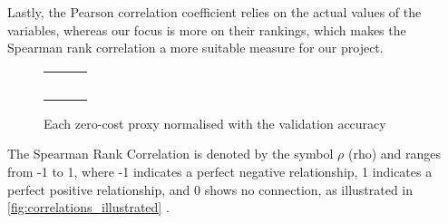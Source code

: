 Lastly, the Pearson correlation coefficient relies on the actual values of the variables, whereas our focus is more on their rankings, which makes the Spearman rank correlation a more suitable measure for our project.


\clearpage

\begin{figure}[h!]
  \centering
    \begin{adjustbox}{width=1.2\columnwidth,center}
  \begin{tabular}{ccc}
     &
     &
     \\
     &
     &
     \\
     &
     &
     \\
     &
     &
     \\
     &
     
  \end{tabular}
  \end{adjustbox}
  \caption{Each zero-cost proxy normalised with the validation accuracy}
  \label{fig:zero_cost_proxies_outliers}
\end{figure}

The Spearman Rank Correlation is denoted by the symbol $\rho$ (rho) and ranges from -1 to 1, where -1 indicates a perfect negative relationship, 1 indicates a perfect positive relationship, and 0 shows no connection, as illustrated in \cref{fig:correlations_illustrated} \autocite{laerdstatistics}.  

